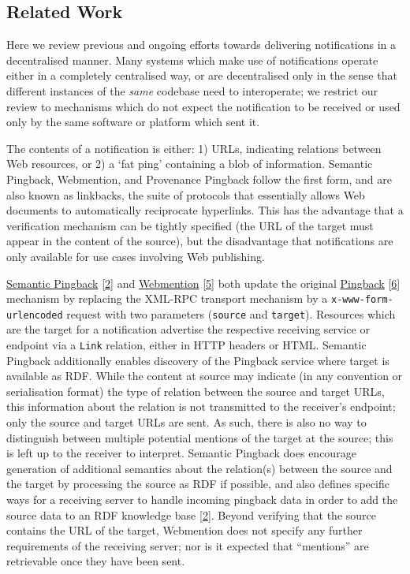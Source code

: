 \documentclass[]{article}
\begin{document}
\hypertarget{related-work}{}
\subsection{Related Work}\label{related-work}

Here we review previous and ongoing efforts towards delivering
notifications in a decentralised manner. Many systems which make use of
notifications operate either in a completely centralised way, or are
decentralised only in the sense that different instances of the
\emph{same} codebase need to interoperate; we restrict our review to
mechanisms which do not expect the notification to be received or used
only by the same software or platform which sent it.

The contents of a notification is either: 1) URLs, indicating relations
between Web resources, or 2) a `fat ping' containing a blob of
information. Semantic Pingback, Webmention, and Provenance Pingback
follow the first form, and are also known as linkbacks, the suite of
protocols that essentially allows Web documents to automatically
reciprocate hyperlinks. This has the advantage that a verification
mechanism can be tightly specified (the URL of the target must appear in
the content of the source), but the disadvantage that notifications are
only available for use cases involving Web publishing.

\href{https://aksw.github.io/SemanticPingback/}{Semantic Pingback}
{[}\protect\hyperlink{ref-2}{2}{]} and
\href{https://www.w3.org/TR/webmention}{Webmention}
{[}\protect\hyperlink{ref-5}{5}{]} both update the original
\href{http://www.hixie.ch/specs/pingback/pingback}{Pingback}
{[}\protect\hyperlink{ref-6}{6}{]} mechanism by replacing the XML-RPC
transport mechanism by a \texttt{x-www-form-urlencoded} request with two
parameters (\texttt{source} and \texttt{target}). Resources which are
the target for a notification advertise the respective receiving service
or endpoint via a \texttt{Link} relation, either in HTTP headers or
HTML. Semantic Pingback additionally enables discovery of the Pingback
service where target is available as RDF. While the content at source
may indicate (in any convention or serialisation format) the type of
relation between the source and target URLs, this information about the
relation is not transmitted to the receiver's endpoint; only the source
and target URLs are sent. As such, there is also no way to distinguish
between multiple potential mentions of the target at the source; this is
left up to the receiver to interpret. Semantic Pingback does encourage
generation of additional semantics about the relation(s) between the
source and the target by processing the source as RDF if possible, and
also defines specific ways for a receiving server to handle incoming
pingback data in order to add the source data to an RDF knowledge base
{[}\protect\hyperlink{ref-2}{2}{]}. Beyond verifying that the source
contains the URL of the target, Webmention does not specify any further
requirements of the receiving server; nor is it expected that
``mentions'' are retrievable once they have been sent.
\end{document}
